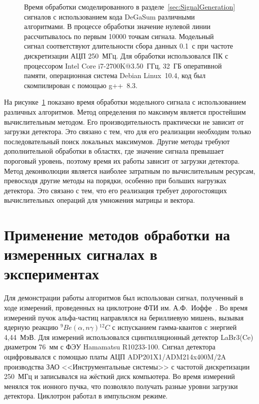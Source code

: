 \begin{figure}[ht!]
  \caption{ Время обработки смоделированного в разделе~\ref{sec:SignalGeneration} сигналов с использованием кода DeGaSum различными алгоритмами. В процессе обработки значение нулевой линии рассчитывалось по первым 10000 точкам сигнала. Модельный сигнал соответствуют длительности сбора данных 0.1~с при частоте дискретизации АЦП 250~МГц. Для обработки использовался ПК с процессором Intel Core i7-2700K@3.50~ГГц, 32~ГБ оперативной памяти, операционная система Debian Linux~10.4, код был скомпилирован с помощью g++~8.3.~\cite{Khilkevitch2020} }
  \label{fig:processingTime}
\end{figure}

На рисунке~\ref{fig:processingTime} показано время обработки модельного сигнала с использованием различных алгоритмов. Метод определения по максимум является простейшим вычислительным методом. Его производительность практически не зависит от загрузки детектора. Это связано с тем, что для его реализации необходим только последовательный поиск локальных максимумов. Другие методы требуют дополнительной обработки в областях, где значение сигнала превышает пороговый уровень, поэтому время их работы зависит от загрузки детектора. Метод деконволюции является наиболее затратным по вычислительным ресурсам, превосходя другие методы на порядки, особенно при больших нагрузках детектора. Это связано с тем, что его реализация требует дорогостоящих вычислительных операций для умножения матрицы и вектора.~\cite{Khilkevitch2020}


\section{Применение методов обработки на измеренных сигналах в экспериментах}

Для демонстрации работы алгоритмов был использован сигнал, полученный в ходе измерений, проведенных на циклотроне ФТИ им. А.Ф.~Иоффе~\cite{Lemberg1987}. Во время измерений пучок альфа-частиц направлялся на бериллиевую мишень, вызывая ядерную реакцию ${}^9Be(\alpha,n\gamma){}^{12}C$ с испусканием гамма-квантов с энергией 4,44~МэВ. Для измерений использовался сцинтилляционный детектор LaBr3(Ce) диаметром 76~мм с ФЭУ Hamamatsu R10233-100. Сигнал детектора оцифровывался с помощью платы АЦП ADP201X1/ADM214x400M/2A производства ЗАО <<Инструментальные системы>> с частотой дискретизации 250~МГц и записывался на жёсткий диск компьютера. Во время измерений менялся ток ионного пучка, что позволяло получать разные уровни загрузки детектора. Циклотрон работал в импульсном режиме.

